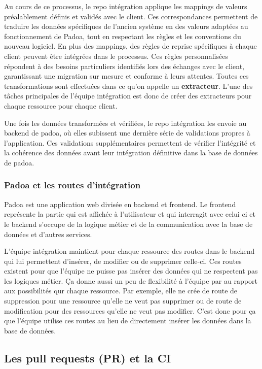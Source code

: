 Au cours de ce processus, le repo intégration applique les mappings de valeurs préalablement définis et validés avec le client. Ces correspondances permettent de traduire les données spécifiques de l’ancien système en des valeurs adaptées au fonctionnement de Padoa, tout en respectant les règles et les conventions du nouveau logiciel. En plus des mappings, des règles de reprise spécifiques à chaque client peuvent être intégrées dans le processus. Ces règles personnalisées répondent à des besoins particuliers identifiés lors des échanges avec le client, garantissant une migration sur mesure et conforme à leurs attentes.
Toutes ces transformations sont effectuées dans ce qu'on appelle un \textbf{extracteur}. L'une des tâches principales de l'équipe intégration est donc de créer des extracteurs pour chaque ressource pour chaque client.

Une fois les données transformées et vérifiées, le repo intégration les envoie au backend de padoa, où elles subissent une dernière série de validations propres à l’application. Ces validations supplémentaires permettent de vérifier l’intégrité et la cohérence des données avant leur intégration définitive dans la base de données de padoa. 

\subsubsection{Padoa et les routes d'intégration}

Padoa est une application web divisée en backend et frontend. Le frontend représente la partie qui est affichée à l'utilisateur et qui interragit avec celui ci et le backend s'occupe de la logique métier et de la communication avec la base de données et d'autres services.

L'équipe intégration maintient pour chaque ressource des routes dans le backend qui lui permettent d'insérer, de modifier ou de supprimer celle-ci. Ces routes existent pour que l'équipe ne puisse pas insérer des données qui ne respectent pas les logiques métier. Ça donne aussi un peu de flexibilité à l'équipe par au rapport aux possibilités qur chaque ressource. Par exemple, elle ne crée de route de suppression pour une ressource qu'elle ne veut pas supprimer ou de route de modification pour des ressources qu'elle ne veut pas modifier. C'est donc pour ça que l'équipe utilise ces routes au lieu de directement insérer les données dans la base de données.

\subsection{Les pull requests (PR) et la CI}

